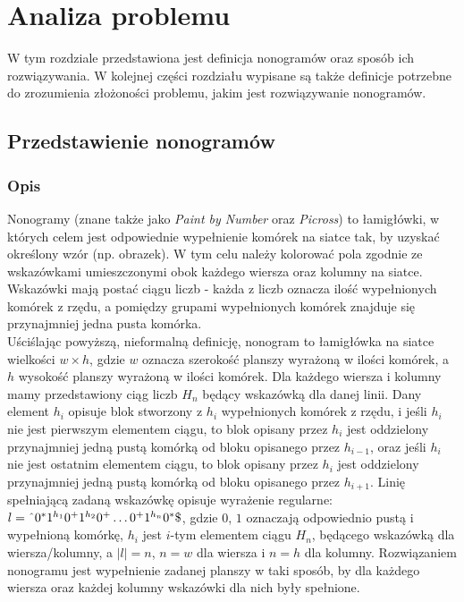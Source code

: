 \chapter{Analiza problemu}
\thispagestyle{chapterBeginStyle}
\label{rozdzial1}

    W tym rozdziale przedstawiona jest definicja nonogramów oraz sposób ich rozwiązywania.
W kolejnej części rozdziału wypisane są także definicje potrzebne do zrozumienia złożoności problemu,
jakim jest rozwiązywanie nonogramów.


\section{Przedstawienie nonogramów}

\subsection{Opis}
    Nonogramy (znane także jako \textit{Paint by Number} oraz \textit{Picross}) to łamigłówki, w których
celem jest odpowiednie wypełnienie komórek na siatce tak, by uzyskać określony wzór (np. obrazek).
W tym celu należy kolorować pola zgodnie ze wskazówkami umieszczonymi obok każdego wiersza oraz kolumny
na siatce. Wskazówki mają postać ciągu liczb - każda z liczb oznacza ilość wypełnionych komórek z rzędu,
a pomiędzy grupami wypełnionych komórek znajduje się przynajmniej jedna pusta komórka.\\
    Uściślając powyższą, nieformalną definicję, nonogram to łamigłówka na siatce wielkości $w \times h$,
gdzie $w$ oznacza szerokość planszy wyrażoną w ilości komórek, a $h$ wysokość planszy wyrażoną w
ilości komórek. Dla każdego wiersza i kolumny mamy przedstawiony ciąg liczb $H_n$ będący wskazówką
dla danej linii. Dany element $h_i$ opisuje blok stworzony z $h_i$ wypełnionych komórek z rzędu, i
jeśli $h_i$ nie jest pierwszym elementem ciągu, to blok opisany przez $h_i$ jest oddzielony 
przynajmniej jedną pustą komórką od bloku opisanego przez $h_{i-1}$, 
oraz jeśli $h_i$ nie jest ostatnim elementem ciągu, to blok opisany przez $h_i$ jest oddzielony
przynajmniej jedną pustą komórką od bloku opisanego przez $h_{i+1}$. Linię spełniającą zadaną wskazówkę
opisuje wyrażenie regularne: $l=\text{\^{}}0^*1^{h_1}0^+1^{h_2}0^+\ldots0^+1^{h_n}0^*\text{\$}$, gdzie 
$0$, $1$ oznaczają odpowiednio pustą i wypełnioną komórkę, $h_i$ jest $i$-tym elementem ciągu $H_n$,
będącego wskazówką dla wiersza/kolumny, a $|l| = n$, $n = w$ dla wiersza i $n = h$ dla kolumny. 
Rozwiązaniem nonogramu jest wypełnienie zadanej planszy w taki sposób, 
by dla każdego wiersza oraz każdej kolumny wskazówki dla nich były spełnione.

